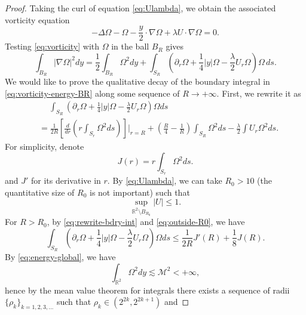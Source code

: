 \documentclass[12pt,reqno]{amsart}
\theoremstyle{plain}
\theoremstyle{definition}
\newcommand{\R}{\mathbb{R}}
\newcommand{\M}{\mathcal{M}}
\renewcommand{\:}{\colon}
\numberwithin{equation}{section}
\numberwithin{figure}{section}
\begin{document}
\begin{proof}
	Taking the curl of equation \eqref{eq:Ulambda}, we obtain the associated vorticity equation
	\begin{equation} \label{eq:vorticity}
		-\Delta \Omega -  \Omega - \frac{y}{2} \cdot \nabla \Omega + \lambda U \cdot \nabla \Omega = 0.
	\end{equation}
	Testing \eqref{eq:vorticity} with $\Omega$ in the ball $B_R$ gives
	\begin{equation} \label{eq:vorticity-energy-BR}
		\int_{B_R} |\nabla \Omega|^2 dy = \frac12 \int_{B_R} \Omega^2 dy + \int_{S_R} \left( \partial_r \Omega + \frac14 |y| \Omega - \frac{\lambda}{2} U_r \Omega  \right)  \Omega \,  ds.  
	\end{equation}
	We would like to prove the qualitative decay of the boundary integral in \eqref{eq:vorticity-energy-BR} along some sequence of $R \to +\infty$. First, we rewrite it as
	\begin{align} \label{eq:rewrite-bdry-int}
		&\quad \ \int_{S_R} \left( \partial_r \Omega + \frac14 |y| \Omega - \frac{\lambda}{2} U_r \Omega  \right)  \Omega  ds \nonumber \\
		&= \frac{1}{2R} \left[\frac{d}{dr} \left(r \int_{S_r} \Omega^2 ds \right)\right]\bigg|_{r=R} + \left( \frac{R}{4} -  \frac{1}{R} \right) \int_{S_R} \Omega^2 ds -\frac{\lambda}{2} \int U_r \Omega^2 ds.
	\end{align} 
	For simplicity, denote 
	\begin{equation}
		J(r) = r \int_{S_r} \Omega^2 ds.
	\end{equation}
	and $J'$ for its derivative in $r$. By \eqref{eq:Ulambda}, we can take $R_0>10$ (the quantitative size of $R_0$ is not important)  such that
	\begin{equation} \label{eq:outside-R0} 
		\sup_{\R^2 \setminus B_{R_0}} |U| \le 1.
	\end{equation}
	For $R > R_0$,  by \eqref{eq:rewrite-bdry-int} and \eqref{eq:outside-R0}, we have
	\begin{equation} \label{eq:upper-A}
		\int_{S_R} \left( \partial_r \Omega + \frac14 |y| \Omega - \frac{\lambda}{2} U_r \Omega  \right)  \Omega  ds \le \frac{1}{2R} J'(R) + \frac{1}{8} J(R).
	\end{equation}
	   By \eqref{eq:energy-global}, we have
	\begin{equation} \label{eq:omega-sq}
		\int_{\R^2} \Omega^2 dy \lesssim \M^2 < +\infty,
	\end{equation} 
	hence by the mean value theorem for integrals there exists a sequence of radii $\{\rho_k\}_{k=1,2,3,\dots}$ such that $\rho_k \in (2^{2k}, 2^{2k+1})$ and

\end{proof}
\end{document}

